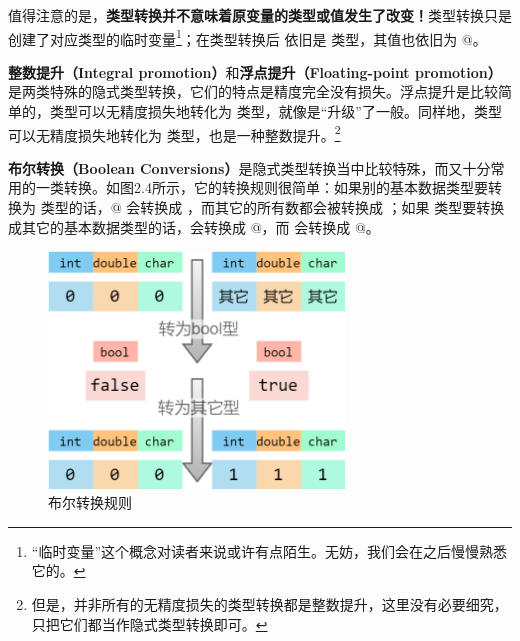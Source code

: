 值得注意的是，\textbf{类型转换并不意味着原变量的类型或值发生了改变！}类型转换只是创建了对应类型的临时变量\footnote{``临时变量''这个概念对读者来说或许有点陌生。无妨，我们会在之后慢慢熟悉它的。}；在类型转换后 \lstinline@d@ 依旧是 \lstinline@double@ 类型，其值也依旧为 @。\par
\textbf{整数提升（Integral promotion）}和\textbf{浮点提升（Floating-point promotion）}是两类特殊的隐式类型转换，它们的特点是精度完全没有损失。浮点提升是比较简单的，\lstinline@float@ 类型可以无精度损失地转化为 \lstinline@double@ 类型，就像是``升级''了一般。同样地，\lstinline@char@ 类型可以无精度损失地转化为 \lstinline@int@ 类型，也是一种整数提升。\footnote{但是，并非所有的无精度损失的类型转换都是整数提升，这里没有必要细究，只把它们都当作隐式类型转换即可。}\par
\label{con:boolean_conversions}
\textbf{布尔转换（Boolean Conversions）}是隐式类型转换当中比较特殊，而又十分常用的一类转换。如图2.4所示，它的转换规则很简单：如果别的基本数据类型要转换为 \lstinline@bool@ 类型的话，@ 会转换成 \lstinline@false@，而其它的所有数都会被转换成 \lstinline@true@；如果 \lstinline@bool@ 类型要转换成其它的基本数据类型的话，\lstinline@false@ 会转换成 @，而 \lstinline@true@ 会转换成 @。\par
\begin{figure}[htbp]
    \centering
    \includegraphics[width=0.7\textwidth]{../images/generalized_parts/02_boolean_conversion_300.png}
    \caption{布尔转换规则}
\end{figure}
